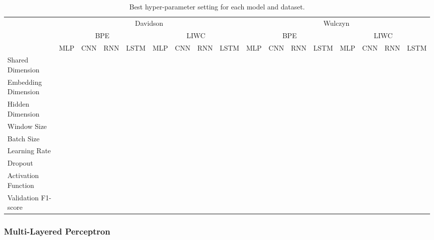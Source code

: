 \begin{landscape}
\begin{table}[]
\centering
\begin{tabular}{lllllllll|llllllll}
                    & \multicolumn{8}{c|}{Davidson}                       & \multicolumn{8}{c}{Wulczyn}                        \\
                    & \multicolumn{4}{c}{BPE} & \multicolumn{4}{c|}{LIWC} & \multicolumn{4}{c}{BPE} & \multicolumn{4}{c}{LIWC} \\
                    & MLP  & CNN & RNN & LSTM & MLP  & CNN  & RNN  & LSTM & MLP  & CNN & RNN & LSTM & MLP  & CNN  & RNN & LSTM \\ \hline
Shared Dimension    &      &     &     &      &      &      &      &      &      &     &     &      &      &      &     &      \\
Embedding Dimension &      &     &     &      &      &      &      &      &      &     &     &      &      &      &     &      \\
Hidden Dimension    &      &     &     &      &      &      &      &      &      &     &     &      &      &      &     &      \\
Window Size         &      &     &     &      &      &      &      &      &      &     &     &      &      &      &     &      \\
Batch Size          &      &     &     &      &      &      &      &      &      &     &     &      &      &      &     &      \\
Learning Rate       &      &     &     &      &      &      &      &      &      &     &     &      &      &      &     &      \\
Dropout             &      &     &     &      &      &      &      &      &      &     &     &      &      &      &     &      \\
Activation Function &      &     &     &      &      &      &      &      &      &     &     &      &      &      &     &      \\
Validation F1-score &      &     &     &      &      &      &      &      &      &     &     &      &      &      &     &     
\end{tabular}
\caption{Best hyper-parameter setting for each model and dataset.}
\label{tab:redux_hyperparam_search}
\end{table}
\end{landscape}

\subsubsection{Multi-Layered Perceptron}

